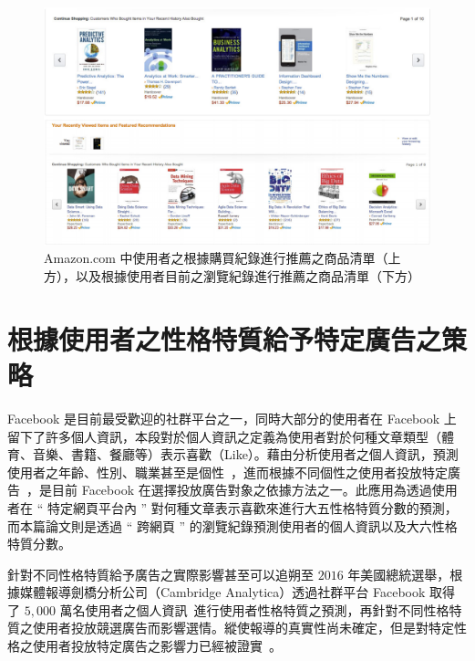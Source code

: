 \begin{figure}
    \graphicspath{{fig/}}
    \begin{center}
    \includegraphics[width=\linewidth]{rec_list.png}
    \caption{{\se Amazon.com} 中使用者之根據購買紀錄進行推薦之商品清單（上方），以及根據使用者目前之瀏覽紀錄進行推薦之商品清單（下方）}
    \label{fig:rec_list}
    \end{center}
\end{figure}

\section{根據使用者之性格特質給予特定廣告之策略}
{Facebook 是目前最受歡迎的社群平台之一，同時大部分的使用者在 Facebook 上留下了許多個人資訊，本段對於個人資訊之定義為使用者對於何種文章類型（體育、音樂、書籍、餐廳等）表示喜歡（Like）。藉由分析使用者之個人資訊，預測使用者之年齡、性別、職業甚至是個性~\cite{kosinski2013private}，進而根據不同個性之使用者投放特定廣告~\cite{matz2017psychological}，是目前 Facebook 在選擇投放廣告對象之依據方法之一。此應用為透過使用者在 “ 特定網頁平台內 ” 對何種文章表示喜歡來進行大五性格特質分數的預測，而本篇論文則是透過 “ 跨網頁 ” 的瀏覽紀錄預測使用者的個人資訊以及大六性格特質分數。\par

 
針對不同性格特質給予廣告之實際影響甚至可以追朔至 $2016$ 年美國總統選舉，根據媒體報導劍橋分析公司（Cambridge Analytica）透過社群平台 Facebook 取得了 $5,000$ 萬名使用者之個人資訊~\cite{cadwalladr2018revealed}進行使用者性格特質之預測，再針對不同性格特質之使用者投放競選廣告而影響選情。縱使報導的真實性尚未確定，但是對特定性格之使用者投放特定廣告之影響力已經被證實~\cite{cadwalladr2018revealed}。

}

